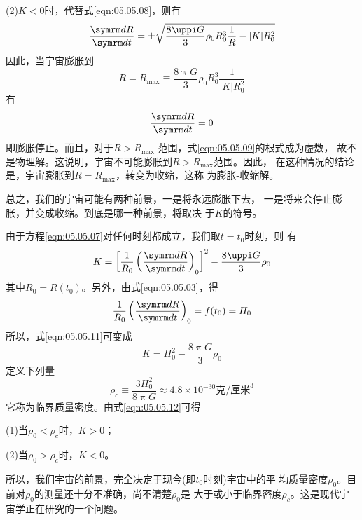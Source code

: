 (2)$ K < 0 $时，代替式\eqref{eqn:05.05.08}，则有
\begin{equation}\label{eqn:05.05.09}
 \frac { \dif R } { \dif t } = \pm \sqrt { \frac { 8 \uppi G } { 3 } \rho _ { 0 } R _ { 0 } ^ { 3 } \frac { 1 } { R } - | K | R _ 0 ^ { 2 } }
\end{equation}
因此，当宇宙膨胀到
\begin{equation}\label{eqn:05.05.10}
 R = R _ { \max } \equiv \frac { 8 \uppi G } { 3 } \rho _ { 0 } R _ { 0 } ^ { 3 } \frac { 1 } { | K | R _ { 0 } ^ 2 }
\end{equation}
有
\begin{equation*}
 \frac { \dif R } { \dif t } = 0
\end{equation*}
即膨胀停止。而且，对于$ R > R _ { \max } $ 范围，式\eqref{eqn:05.05.09}的根式成为虚数，
故不是物理解。这说明，宇宙不可能膨胀到$ R > R _ { \max } $范围。因此，
在这种情况的结论是，宇宙膨胀到$ R = R _ { \max } $，转变为收缩，这称
为膨胀-收缩解。

总之，我们的宇宙可能有两种前景，一是将永远膨胀下去，
一是将来会停止膨胀，并变成收缩。到底是哪一种前景，将取决
于$ K $的符号。

由于方程\eqref{eqn:05.05.07}对任何时刻都成立，我们取$ t=t_0 $时刻，则
有
\begin{equation}\label{eqn:05.05.11}
 K = \left[ \frac { 1 } { R _ { 0 } } \left( \frac { \dif R } { \dif t } \right) _ 0 \right] ^ { 2 } - \frac { 8 \uppi G } { 3 } \rho _ { 0 }
\end{equation}
其中$ R _ { 0 } = R ( t _ { 0 } ) $。另外，由式\eqref{eqn:05.05.03}，得
\begin{equation*}
 \frac { 1 } { R _ { 0 } } \left( \frac { \dif R } { \dif t } \right) _ { 0 } = f ( t _ { 0 } ) = H _ { 0 }
\end{equation*}
所以，式\eqref{eqn:05.05.11}可变成
\clearpage
\begin{equation}\label{eqn:05.05.12}
 K = H _ 0 ^ { 2 } - \frac { 8 \uppi G } { 3 } \rho _ { 0 }
\end{equation}
定义下列量
\begin{equation*}
 \rho _ { c } \equiv \frac { 3 H _ 0 ^ { 2 } } { 8 \uppi G } \approx 4.8 \times 10 ^ { -30 } \text{克/厘米} ^ 3
\end{equation*}
它称为临界质量密度。由式\eqref{eqn:05.05.12}可得

(1)当$ \rho _ { 0 } < \rho _ { c } $时，$ K > 0 $；

(2)当$ \rho _ { 0 } > \rho _ { c } $时，$ K < 0 $。

\noindent 所以，我们宇宙的前景，完全决定于现今(即$ t _ { 0 } $时刻)宇宙中的平
均质量密度$ \rho _ { 0 } $。目前对$ \rho _ { 0 } $的测量还十分不准确，尚不清楚$ \rho _ { 0 } $是
大于或小于临界密度$ \rho _ { c } $。这是现代宇宙学正在研究的一个问题。